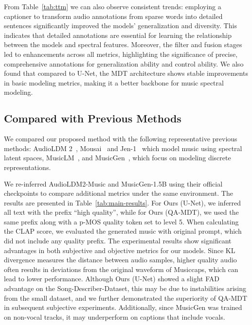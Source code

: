   
  
From Table~\ref{tab:ttm} we can also observe consistent trends: employing a captioner to transform audio annotations from sparse words into detailed sentences significantly improved the models’ generalization and diversity. This indicates that detailed annotations are essential for learning the relationship between the models and spectral features. Moreover, the filter and fusion stages led to enhancements across all metrics, highlighting the significance of precise, comprehensive annotations for generalization ability and control ability. We also found that compared to U-Net, the MDT architecture shows stable improvements in basic modeling metrics, making it a better backbone for music spectral modeling.

\subsection{Compared with Previous Methods}
We compared our proposed method with the following representative previous methods: AudioLDM 2~\citep{liu2023audioldm2}, Mousai~\citep{schneider2023mo} and Jen-1~\citep{li2023jen} which model music using spectral latent spaces, MusicLM~\citep{agostinelli2023musiclm}, and MusicGen~\cite{copet2024simple}, which focus on modeling discrete representations.

We re-inferred AudioLDM2-Music and MusicGen-1.5B using their official checkpoints to compare additional metrics under the same environment. The results are presented in Table~\ref{tab:main-results}. For Ours (U-Net), we inferred all text with the prefix ``high quality'', while for Ours (QA-MDT), we used the same prefix along with a p-MOS quality token set to level 5. When calculating the CLAP score, we evaluated the generated music with original prompt, which did not include any quality prefix.
The experimental results show significant advantages in both subjective and objective metrics for our models. Since KL divergence measures the distance between audio samples, higher quality audio often results in deviations from the original waveform of Musiccaps, which can lead to lower performance. Although Ours (U-Net) showed a slight FAD advantage on the Song-Describer-Dataset, this may be due to instabilities arising from the small dataset, and we further demonstrated the superiority of QA-MDT in subsequent subjective experiments. Additionally, since MusicGen was trained on non-vocal tracks, it may underperform on captions that include vocals.


